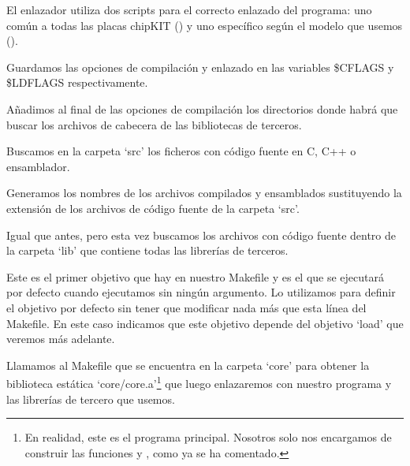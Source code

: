 
El enlazador utiliza dos scripts para el correcto enlazado del programa: uno común a todas las placas chipKIT () y uno específico según el modelo que usemos ().


Guardamos las opciones de compilación y enlazado en las variables \$CFLAGS y \$LDFLAGS respectivamente.


Añadimos al final de las opciones de compilación los directorios donde habrá que buscar los archivos de cabecera de las bibliotecas de terceros.


Buscamos en la carpeta `src' los ficheros con código fuente en C, C++ o ensamblador.


Generamos los nombres de los archivos compilados y ensamblados sustituyendo la extensión de los archivos de código fuente de la carpeta `src'.


Igual que antes, pero esta vez buscamos los archivos con código fuente dentro de la carpeta `lib' que contiene todas las librerías de terceros.


Este es el primer objetivo que hay en nuestro Makefile y es el que se ejecutará por defecto cuando ejecutamos  sin ningún argumento. Lo utilizamos para definir el objetivo por defecto sin tener que modificar nada más que esta línea del Makefile. En este caso indicamos que este objetivo depende del objetivo `load' que veremos más adelante.


Llamamos al Makefile que se encuentra en la carpeta `core' para obtener la biblioteca estática `core/core.a'\protect\footnote{En realidad, este es el programa principal. Nosotros solo nos encargamos de construir las funciones  y , como ya se ha comentado.} que luego enlazaremos con nuestro programa y las librerías de tercero que usemos.

